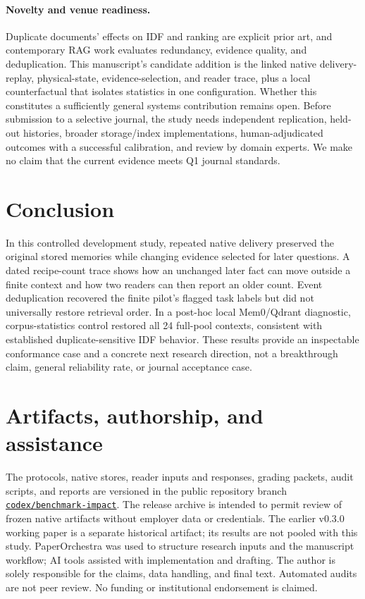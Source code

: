 \documentclass[10pt,letterpaper]{article}
\begin{document}
\paragraph{Novelty and venue readiness.} Duplicate documents' effects on IDF and ranking are explicit prior art, and contemporary RAG work evaluates redundancy, evidence quality, and deduplication. This manuscript's candidate addition is the linked native delivery-replay, physical-state, evidence-selection, and reader trace, plus a local counterfactual that isolates statistics in one configuration. Whether this constitutes a sufficiently general systems contribution remains open. Before submission to a selective journal, the study needs independent replication, held-out histories, broader storage/index implementations, human-adjudicated outcomes with a successful calibration, and review by domain experts. We make no claim that the current evidence meets Q1 journal standards.

\section{Conclusion}
In this controlled development study, repeated native delivery preserved the original stored memories while changing evidence selected for later questions. A dated recipe-count trace shows how an unchanged later fact can move outside a finite context and how two readers can then report an older count. Event deduplication recovered the finite pilot's flagged task labels but did not universally restore retrieval order. In a post-hoc local Mem0/Qdrant diagnostic, corpus-statistics control restored all 24 full-pool contexts, consistent with established duplicate-sensitive IDF behavior. These results provide an inspectable conformance case and a concrete next research direction, not a breakthrough claim, general reliability rate, or journal acceptance case.

\section*{Artifacts, authorship, and assistance}
The protocols, native stores, reader inputs and responses, grading packets, audit scripts, and reports are versioned in the public repository branch \href{https://github.com/aditya-genies/beyond-recall/tree/codex/benchmark-impact}{\texttt{codex/benchmark-impact}}. The release archive is intended to permit review of frozen native artifacts without employer data or credentials. The earlier v0.3.0 working paper is a separate historical artifact; its results are not pooled with this study. PaperOrchestra was used to structure research inputs and the manuscript workflow; AI tools assisted with implementation and drafting. The author is solely responsible for the claims, data handling, and final text. Automated audits are not peer review. No funding or institutional endorsement is claimed.


{\small}
\end{document}
